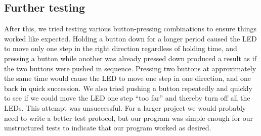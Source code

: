 

\subsection{Further testing}
After this, we tried testing various button-pressing combinations to ensure things worked like expected. Holding a button down for a longer period caused the LED to move only one step in the right direction regardless of holding time, and pressing a button while another was already pressed down produced a result as if the two buttons were pushed in sequence. Pressing two buttons at approximately the same time would cause the LED to move one step in one direction, and one back in quick succession. We also tried pushing a button repeatedly and quickly to see if we could move the LED one step ``too far'' and thereby turn off all the LEDs. This attempt was unsuccessful. For a larger project we would probably need to write a better test protocol, but our program was simple enough for our unstructured tests to indicate that our program worked as desired.
